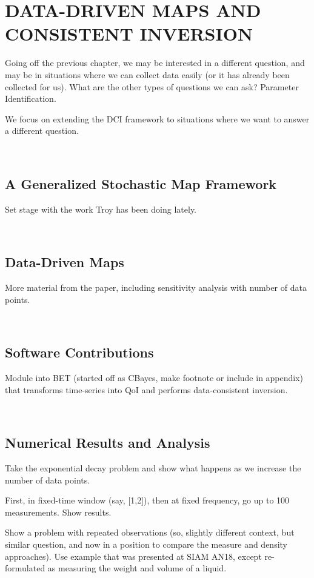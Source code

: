 \chapter{\uppercase{Data-Driven Maps and Consistent Inversion} \label{chapter:04}}

Going off the previous chapter, we may be interested in a different question, and may be in situations where we can collect data easily (or it has already been collected for us).
What are the other types of questions we can ask? Parameter Identification. 

We focus on extending the DCI framework to situations where we want to answer a different question.

\
\section{A Generalized Stochastic Map Framework}

Set stage with the work Troy has been doing lately.

\
\section{Data-Driven Maps}

More material from the paper, including sensitivity analysis with number of data points.

\
\section{Software Contributions}

Module into BET (started off as CBayes, make footnote or include in appendix) that transforms time-series into QoI and performs data-consistent inversion.

\
\section{Numerical Results and Analysis}

Take the exponential decay problem and show what happens as we increase the number of data points.

First, in fixed-time window (say, [1,2]), then at fixed frequency, go up to 100 measurements. Show results.

Show a problem with repeated observations (so, slightly different context, but similar question, and now in a position to compare the measure and density approaches). Use example that was presented at SIAM AN18, except re-formulated as measuring the weight and volume of a liquid. 